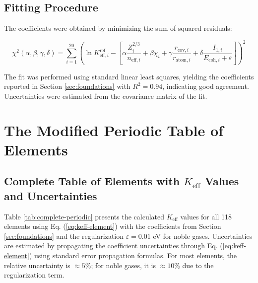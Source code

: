 \documentclass[12pt,a4paper]{article}
\theoremstyle{remark}
\newcommand{\Keff}{K_{\mathrm{eff}}}
\begin{document}
	\subsection{Fitting Procedure}
	
	The coefficients were obtained by minimizing the sum of squared residuals:
	
	\begin{equation}
		\chi^2(\alpha,\beta,\gamma,\delta) = \sum_{i=1}^{20} \left( \ln K_{\mathrm{eff},i}^{\text{ref}} - \left[ \alpha \frac{Z_i^{2/3}}{n_{\text{eff},i}} + \beta \chi_i + \gamma \frac{r_{\text{cov},i}}{r_{\text{atom},i}} + \delta \frac{I_{1,i}}{E_{\text{coh},i} + \varepsilon} \right] \right)^2
		\label{eq:chi2}
	\end{equation}
	
	The fit was performed using standard linear least squares, yielding the coefficients reported in Section \ref{sec:foundations} with $R^2 = 0.94$, indicating good agreement. Uncertainties were estimated from the covariance matrix of the fit.
	
	\section{The Modified Periodic Table of Elements}
	\label{sec:periodic-table}
	
	\subsection{Complete Table of Elements with $\Keff$ Values and Uncertainties}
	
	Table \ref{tab:complete-periodic} presents the calculated $\Keff$ values for all 118 elements using Eq. (\ref{eq:keff-element}) with the coefficients from Section \ref{sec:foundations} and the regularization $\varepsilon = 0.01$ eV for noble gases. Uncertainties are estimated by propagating the coefficient uncertainties through Eq. (\ref{eq:keff-element}) using standard error propagation formulas. For most elements, the relative uncertainty is $\approx 5\%$; for noble gases, it is $\approx 10\%$ due to the regularization term.
	
\end{document}
